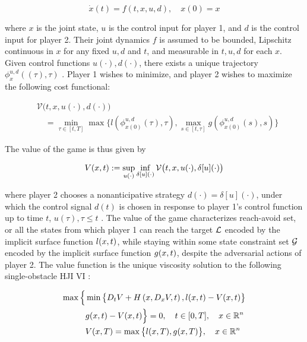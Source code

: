 \begin{equation}
\dot{x}(t) = f(t, x, u, d), \quad x(0) = x
\end{equation}

\noindent where $x$ is the joint state, $u$ is the control input for player 1, and $d$ is the control input for player 2. Their joint dynamics $f$ is assumed to be bounded, Lipschitz continuous in $x$ for any fixed $u,d$ and $t$, and measurable in $t,u,d$ for each $x$. Given control functions $u(\cdot), d(\cdot)$, there exists a unique trajectory $\phi_x^{u,d}((\tau),\tau)$ \cite{coddington55}. Player 1 wishes to minimize, and player 2 wishes to maximize the following cost functional:

\begin{equation}
\begin{aligned}
&\mathcal{V}\big(t,x,u(\cdot),d(\cdot)\big) \\
&\quad = \min_{\tau\in[t,T]}\max\big\{l(\phi_{x(0)}^{u,d}(\tau),\tau),\max_{s\in[t,\tau]} g(\phi_{x(0)}^{u,d}(s),s)\big\}
\end{aligned}
\end{equation}

The value of the game is thus given by

\begin{equation}
\begin{aligned}
V(x,t):=\sup_{u(\cdot)}\inf_{\delta[u](\cdot)}\mathcal{V}\big(t,x,u(\cdot),\delta[u](\cdot)\big)
\end{aligned}
\end{equation}

\noindent where player 2 chooses a nonanticipative strategy $d(\cdot) = \delta[u](\cdot)$, under which the control signal $d(t)$ is chosen in response to player 1's control function up to time $t$, $u(\tau),\tau\le t$ \cite{mitchell-thesis}. The value of the game characterizes reach-avoid set, or all the states from which player 1 can reach the target $\mathcal{L}$ encoded by the implicit surface function $l(x,t)$, while staying within some state constraint set $\mathcal{G}$ encoded by the implicit surface function $g(x,t)$, despite the adversarial actions of player 2. The value function is the unique viscosity solution \cite{crandall84} to the following single-obstacle HJI VI \cite{fisac15}:

\begin{equation}
\label{eq:HJIVI_full}
\begin{aligned}
\max\Big\{&\min\big\{D_t V + H\left(x, D_x V,t\right),l(x,t)-V(x, t)\big\}\\
& g(x,t)-V(x,t)\Big\}=0, \quad t\in[0,T], \quad x\in\mathbb{R}^n\\
&V(x,T) = \max\big\{l(x,T),g(x,T)\big\},  \quad x\in\mathbb{R}^n
\end{aligned}
\end{equation}

